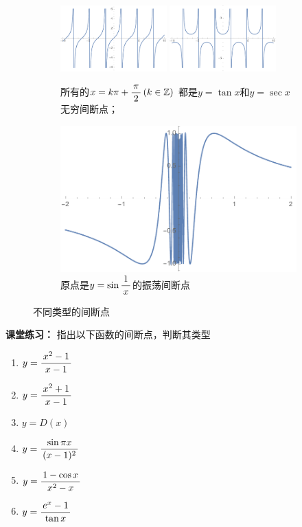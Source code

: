\begin{figure}[h]
	\begin{subfigure}[t]{.95\textwidth}
		\centering
		\includegraphics[width=0.45\textwidth]{./Images/Ch01/tanx.pdf}
		\quad
		\includegraphics[width=0.45\textwidth]{./Images/Ch01/secx.pdf}
		\caption{所有的$x=k\pi+\displaystyle\frac{\,{\pi}\,}{\,{2}\,}\,(k\in\mathbb{Z})$
		都是$y=\tan x$和$y=\sec x$无穷间断点；}	
	\end{subfigure}
	
	\begin{subfigure}[t]{0.5\textwidth}
		\centering
		\includegraphics[width=\textwidth]{./Images/Ch01/sin1ox.pdf}
		\caption{原点是$y=\sin\displaystyle\frac{\,{1}\,}{\,{x}\,}$的振荡间断点}	
	\end{subfigure}
	\caption{不同类型的间断点}
	\label{fig:discontPoint}
\end{figure}

\bs
{\bf 课堂练习：} 指出以下函数的间断点，判断其类型
\begin{enumerate}[(1)]
  \setlength{\itemindent}{1cm}
  \item $y=\displaystyle\frac{\,{x^2-1}\,}{\,{x-1}\,}$
  \item $y=\displaystyle\frac{\,{x^2+1}\,}{\,{x-1}\,}$
  \item $y=D(x)$
  \item $y=\displaystyle\frac{\,{\sin\pi x}\,}{\,{(x-1)^2}\,}$
  \item $y=\displaystyle\frac{\,{1-\cos x}\,}{\,{x^2-x}\,}$
  \item $y=\displaystyle\frac{\,{e^x-1}\,}{\,{\tan x}\,}$
\end{enumerate}

